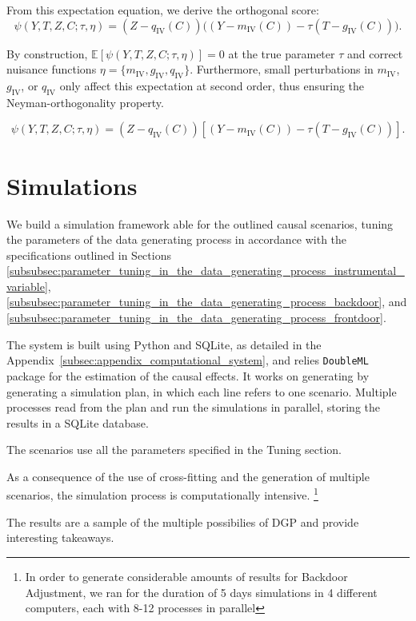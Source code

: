 \documentclass{article}
\numberwithin{equation}{section}
\begin{document}
From this expectation equation, we derive the orthogonal score:
\[
\psi(Y, T, Z, C; \tau, \eta) 
= (Z - q_{\text{IV}}(C))\bigl((Y - m_{\text{IV}}(C)) - \tau (T - g_{\text{IV}}(C))\bigr).
\]

By construction, \(\mathbb{E}[\psi(Y, T, Z, C; \tau, \eta)] = 0\) at the true parameter \(\tau\) and correct nuisance functions \(\eta = \{m_{\text{IV}}, g_{\text{IV}}, q_{\text{IV}}\}\). Furthermore, small perturbations in \(m_{\text{IV}}\), \(g_{\text{IV}}\), or \(q_{\text{IV}}\) only affect this expectation at second order, thus ensuring the Neyman-orthogonality property.

\begin{equation}
\psi(Y, T, Z, C; \tau, \eta) 
= (Z - q_{\text{IV}}(C)) \left[ (Y - m_{\text{IV}}(C)) - \tau (T - g_{\text{IV}}(C)) \right].
\end{equation}

\section{Simulations}

We build a simulation framework able for the outlined causal scenarios, tuning the parameters of the data generating process in accordance with the specifications outlined in Sections \ref{subsubsec:parameter_tuning_in_the_data_generating_process_instrumental_variable}, \ref{subsubsec:parameter_tuning_in_the_data_generating_process_backdoor}, and \ref{subsubsec:parameter_tuning_in_the_data_generating_process_frontdoor}.

The system is built using Python and SQLite, as detailed in the Appendix~\ref{subsec:appendix_computational_system}, and relies \texttt{DoubleML} package for the estimation of the causal effects. It works on generating by generating a simulation plan, in which each line refers to one scenario. Multiple processes read from the plan and run the simulations in parallel, storing the results in a SQLite database.

The scenarios use all the parameters specified in the Tuning section.

As a consequence of the use of cross-fitting and the generation of multiple scenarios, the simulation process is computationally intensive. \footnote{In order to generate considerable amounts of results for Backdoor Adjustment, we ran for the duration of 5 days simulations in 4 different computers, each with 8-12 processes in parallel}

The results are a sample of the multiple possibilies of DGP and provide interesting takeaways.
\end{document}
